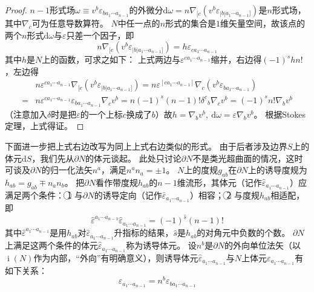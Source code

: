 \begin{proof}
    $n - 1$形式场$\omega \equiv v^b\varepsilon_{b a_1 \cdots a_{n - 1}}$的外微分$\mathrm{d}\omega = n\nabla_{[c}(v^b\varepsilon_{|b|a_1 \cdots a_{n - 1}]})$是$n$形式场，其中$\nabla_c$可为任意导数算符。
    $N$中任一点的$n$形式的集合是$1$维矢量空间，故该点的两个$n$形式$\mathrm{d}\omega$与$\varepsilon$只差一个因子，即
    $$n\nabla_{[c}(v^b\varepsilon_{|b|a_1 \cdots a_{n - 1}]}) = h\varepsilon_{ca_1 \cdots a_{n - 1}}$$
    其中$h$是$N$上的函数，可求之如下：
    上式两边与$\varepsilon^{ca_1 \cdots a_{n - 1}}$缩并，右边得$(-1)^shn!$，左边得
    \[\begin{split}
        & n\varepsilon^{ca_1 \cdots a_{n - 1}}\nabla_{[c}(v^b\varepsilon_{|b|a_1 \cdots a_{n - 1}]}) = n\varepsilon^{[ca_1 \cdots a_{n - 1}]}\nabla_{c}(v^b\varepsilon_{ba_1 \cdots a_{n - 1}}) \\
        = & n\varepsilon^{ca_1 \cdots a_{n - 1}}\varepsilon_{ba_1 \cdots a_{n - 1}}\nabla_{c}v^b = n(-1)^s(n - 1)!\delta^c{}_b\nabla_cv^b = (-1)^sn!\nabla_bv^b
    \end{split}\]
    （注意加入$\delta$时是把$\varepsilon$的一个上标$c$换成了$b$）故$h = \nabla_bv^b, ~ \mathrm{d}\omega = \varepsilon\nabla_bv^b$。
    根据Stokes定理，上式得证。
\end{proof}

下面进一步把上式右边改写为同上上式右边类似的形式。
由于后者涉及边界$S$上的体元$\mathrm{d}S$，我们先从$\partial N$的体元谈起。
此处只讨论$\partial N$不是类光超曲面的情况，这时可谈及$\partial N$的归一化法矢$n^a$，满足$n^an_a = \pm 1$。
$N$上的度规$g_{ab}$在$\partial N$上的诱导度规为$h_{ab} = g_{ab} \mp n_an_b$。
把$\partial N$看作带度规$h_{ab}$的$n - 1$维流形，其体元（记作$\hat\varepsilon_{a_1 \cdots a_{n - 1}}$）应满足两个条件：
\textcircled{1} 与$\partial N$的诱导定向（记作$\bar\varepsilon_{a_1 \cdots a_{n - 1}}$）相容；
\textcircled{2} 与度规$h_{ab}$相适配，即
$$\hat\varepsilon^{a_1 \cdots a_{n - 1}}\hat\varepsilon_{a_1 \cdots a_{n - 1}} = (-1)^{\hat s}(n - 1)!$$
其中$\hat\varepsilon^{a_1 \cdots a_{n - 1}}$是用$h_{ab}$对$\hat\varepsilon_{a_1 \cdots a_{n - 1}}$升指标的结果，$\hat s$是$h_{ab}$的对角元中负数的个数。
$\partial N$上满足这两个条件的体元$\hat\varepsilon_{a_1 \cdots a_{n - 1}}$称为诱导体元。
设$n^b$是$\partial N$的外向单位法矢（以$\operatorname{i}(N)$作为内部，``外向''有明确意义），则诱导体元$\hat\varepsilon_{a_1 \cdots a_{n - 1}}$与$N$上体元$\varepsilon_{a_1 \cdots a_{n - 1}}$有如下关系：
$$\hat\varepsilon_{a_1 \cdots a_{n - 1}} = n^b\varepsilon_{b a_1 \cdots a_{n - 1}}$$

